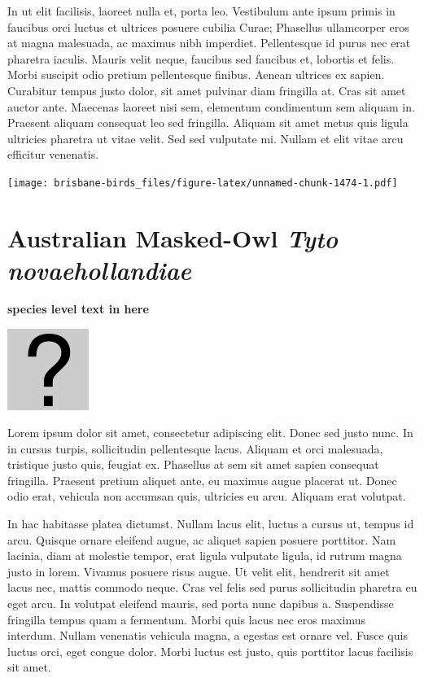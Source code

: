 \documentclass[]{book}
\let\origfigure\figure
\let\endorigfigure\endfigure
\renewenvironment{figure}[1][2] {
  \expandafter\origfigure\expandafter[H]
} {
  \endorigfigure
}
\begin{document}
In ut elit facilisis, laoreet nulla et, porta leo. Vestibulum ante ipsum
primis in faucibus orci luctus et ultrices posuere cubilia Curae;
Phasellus ullamcorper eros at magna malesuada, ac maximus nibh
imperdiet. Pellentesque id purus nec erat pharetra iaculis. Mauris velit
neque, faucibus sed faucibus et, lobortis et felis. Morbi suscipit odio
pretium pellentesque finibus. Aenean ultrices ex sapien. Curabitur
tempus justo dolor, sit amet pulvinar diam fringilla at. Cras sit amet
auctor ante. Maecenas laoreet nisi sem, elementum condimentum sem
aliquam in. Praesent aliquam consequat leo sed fringilla. Aliquam sit
amet metus quis ligula ultricies pharetra ut vitae velit. Sed sed
vulputate mi. Nullam et elit vitae arcu efficitur venenatis.

\begin{figure}
\centering
\texttt{[image: brisbane-birds\_files/figure-latex/unnamed-chunk-1474-1.pdf]}
\caption{\label{fig:unnamed-chunk-1474}insert figure caption}
\end{figure}

\section{\texorpdfstring{Australian Masked-Owl \emph{Tyto
novaehollandiae}}{Australian Masked-Owl Tyto novaehollandiae}}\label{australian-masked-owl-tyto-novaehollandiae}

\textbf{species level text in here}

\begin{figure}
\centering
\includegraphics{assets/missing.png}
\caption{No image for species}
\end{figure}

Lorem ipsum dolor sit amet, consectetur adipiscing elit. Donec sed justo
nunc. In in cursus turpis, sollicitudin pellentesque lacus. Aliquam et
orci malesuada, tristique justo quis, feugiat ex. Phasellus at sem sit
amet sapien consequat fringilla. Praesent pretium aliquet ante, eu
maximus augue placerat ut. Donec odio erat, vehicula non accumsan quis,
ultricies eu arcu. Aliquam erat volutpat.

In hac habitasse platea dictumst. Nullam lacus elit, luctus a cursus ut,
tempus id arcu. Quisque ornare eleifend augue, ac aliquet sapien posuere
porttitor. Nam lacinia, diam at molestie tempor, erat ligula vulputate
ligula, id rutrum magna justo in lorem. Vivamus posuere risus augue. Ut
velit elit, hendrerit sit amet lacus nec, mattis commodo neque. Cras vel
felis sed purus sollicitudin pharetra eu eget arcu. In volutpat eleifend
mauris, sed porta nunc dapibus a. Suspendisse fringilla tempus quam a
fermentum. Morbi quis lacus nec eros maximus interdum. Nullam venenatis
vehicula magna, a egestas est ornare vel. Fusce quis luctus orci, eget
congue dolor. Morbi luctus est justo, quis porttitor lacus facilisis sit
amet.
\end{document}
